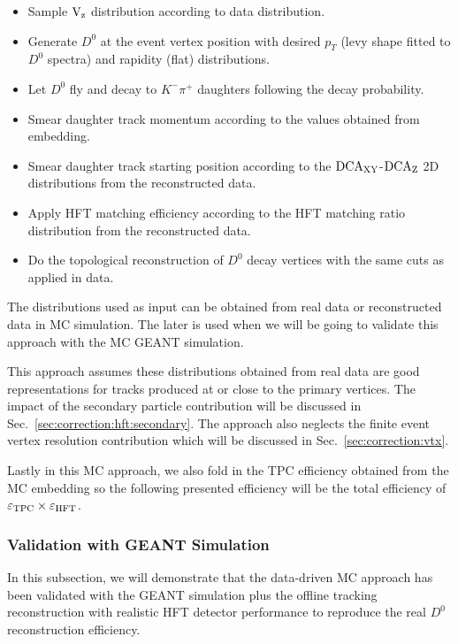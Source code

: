\documentclass[%
 reprint,	
 amsmath,amssymb,
 aps,
 prc,
]{revtex4-1}
\begin{document}
 \begin{itemize} 
\item Sample $\textup{V}_\textup{z}$ distribution according to data distribution.
\item Generate $D^0$ at the event vertex position with desired $p_T$ (levy shape fitted to $D^0$ spectra) and rapidity (flat) distributions.
\item Let $D^0$ fly and decay to $K^-\pi^+$ daughters following the decay probability.
\item Smear daughter track momentum according to the values obtained from embedding.
\item Smear daughter track starting position according to the $\textup{DCA}_{\textup{XY}}$-$\textup{DCA}_\textup{Z}$ 2D distributions from the reconstructed data.
\item Apply HFT matching efficiency according to the HFT matching ratio distribution from the reconstructed data.
\item Do the topological reconstruction of $D^0$ decay vertices with the same cuts as applied in data.
 \end{itemize} 
The distributions used as input can be obtained from real data or reconstructed data in MC simulation. The later is used when we will be going to validate this approach with the MC GEANT simulation. 

This approach assumes these distributions obtained from real data are good representations for tracks produced at or close to the primary vertices. The impact of the secondary particle contribution will be discussed in Sec.~\ref{sec:correction:hft:secondary}. The approach also neglects the finite event vertex resolution contribution which will be discussed in Sec.~\ref{sec:correction:vtx}.

Lastly in this MC approach, we also fold in the TPC efficiency obtained from the MC embedding so the following presented efficiency will be the total efficiency of $\varepsilon_{\rm TPC}\times\varepsilon_{\rm HFT}$.

\subsubsection{\label{sec:correction:hft:validation}Validation with GEANT Simulation}

In this subsection, we will demonstrate that the data-driven MC approach has been validated with the GEANT simulation plus the offline tracking reconstruction with realistic HFT detector performance to reproduce the real $D^0$ reconstruction efficiency.
\end{document}
